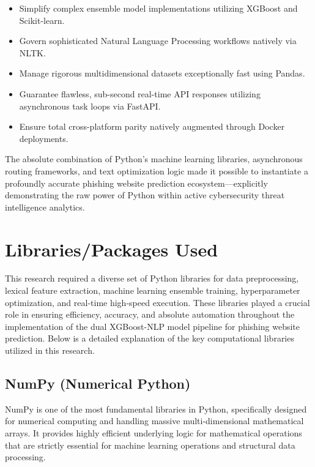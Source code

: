 \begin{itemize}
\item Simplify complex ensemble model implementations utilizing XGBoost and Scikit-learn.
\item Govern sophisticated Natural Language Processing workflows natively via NLTK.
\item Manage rigorous multidimensional datasets exceptionally fast using Pandas.
\item Guarantee flawless, sub-second real-time API responses utilizing asynchronous task loops via FastAPI.
\item Ensure total cross-platform parity natively augmented through Docker deployments.
\end{itemize}
\noindent
The absolute combination of Python's machine learning libraries, asynchronous routing frameworks, and text optimization logic made it possible to instantiate a profoundly accurate phishing website prediction ecosystem---explicitly demonstrating the raw power of Python within active cybersecurity threat intelligence analytics.

\section{Libraries/Packages Used}

This research required a diverse set of Python libraries for data preprocessing, lexical feature extraction, machine learning ensemble training, hyperparameter optimization, and real-time high-speed execution. These libraries played a crucial role in ensuring efficiency, accuracy, and absolute automation throughout the implementation of the dual XGBoost-NLP model pipeline for phishing website prediction. Below is a detailed explanation of the key computational libraries utilized in this research.

\subsection{NumPy (Numerical Python)}
\noindent
NumPy is one of the most fundamental libraries in Python, specifically designed for numerical computing and handling massive multi-dimensional mathematical arrays. It provides highly efficient underlying logic for mathematical operations that are strictly essential for machine learning operations and structural data processing.

